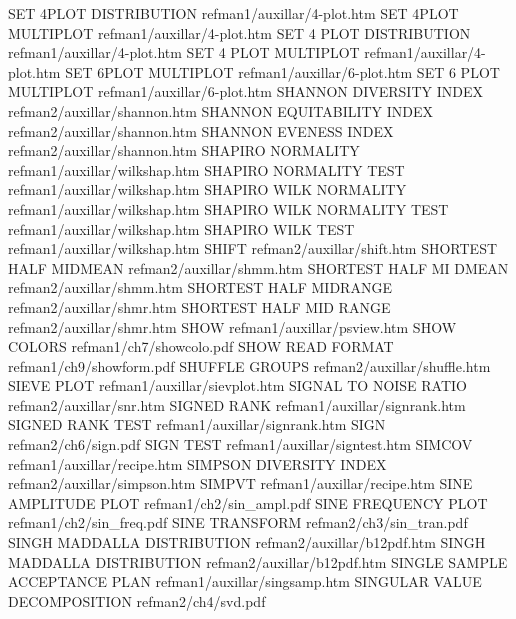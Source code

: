 SET 4PLOT DISTRIBUTION                  refman1/auxillar/4-plot.htm
SET 4PLOT MULTIPLOT                     refman1/auxillar/4-plot.htm
SET 4 PLOT DISTRIBUTION                 refman1/auxillar/4-plot.htm
SET 4 PLOT MULTIPLOT                    refman1/auxillar/4-plot.htm
SET 6PLOT MULTIPLOT                     refman1/auxillar/6-plot.htm
SET 6 PLOT MULTIPLOT                    refman1/auxillar/6-plot.htm
SHANNON DIVERSITY INDEX                 refman2/auxillar/shannon.htm
SHANNON EQUITABILITY INDEX              refman2/auxillar/shannon.htm
SHANNON EVENESS INDEX                   refman2/auxillar/shannon.htm
SHAPIRO NORMALITY                       refman1/auxillar/wilkshap.htm
SHAPIRO NORMALITY TEST                  refman1/auxillar/wilkshap.htm
SHAPIRO WILK NORMALITY                  refman1/auxillar/wilkshap.htm
SHAPIRO WILK NORMALITY TEST             refman1/auxillar/wilkshap.htm
SHAPIRO WILK TEST                       refman1/auxillar/wilkshap.htm
SHIFT                                   refman2/auxillar/shift.htm
SHORTEST HALF MIDMEAN                   refman2/auxillar/shmm.htm
SHORTEST HALF MI DMEAN                  refman2/auxillar/shmm.htm
SHORTEST HALF MIDRANGE                  refman2/auxillar/shmr.htm
SHORTEST HALF MID RANGE                 refman2/auxillar/shmr.htm
SHOW                                    refman1/auxillar/psview.htm
SHOW COLORS                             refman1/ch7/showcolo.pdf
SHOW READ FORMAT                        refman1/ch9/showform.pdf
SHUFFLE GROUPS                          refman2/auxillar/shuffle.htm
SIEVE PLOT                              refman1/auxillar/sievplot.htm
SIGNAL TO NOISE RATIO                   refman2/auxillar/snr.htm
SIGNED RANK                             refman1/auxillar/signrank.htm
SIGNED RANK TEST                        refman1/auxillar/signrank.htm
SIGN                                    refman2/ch6/sign.pdf
SIGN TEST                               refman1/auxillar/signtest.htm
SIMCOV                                  refman1/auxillar/recipe.htm
SIMPSON DIVERSITY INDEX                 refman2/auxillar/simpson.htm
SIMPVT                                  refman1/auxillar/recipe.htm
SINE AMPLITUDE PLOT                     refman1/ch2/sin_ampl.pdf
SINE FREQUENCY PLOT                     refman1/ch2/sin_freq.pdf
SINE TRANSFORM                          refman2/ch3/sin_tran.pdf
SINGH MADDALLA DISTRIBUTION             refman2/auxillar/b12pdf.htm
SINGH MADDALLA DISTRIBUTION             refman2/auxillar/b12pdf.htm
SINGLE SAMPLE ACCEPTANCE PLAN           refman1/auxillar/singsamp.htm
SINGULAR VALUE DECOMPOSITION            refman2/ch4/svd.pdf
